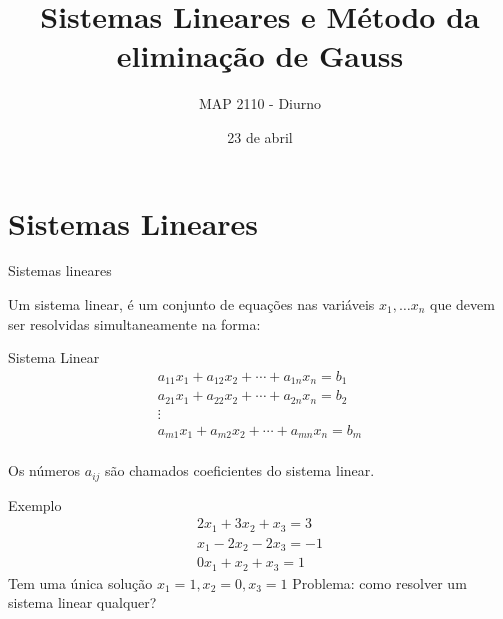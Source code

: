 \documentclass{beamer}
\title[Sistemas Lineares]{Sistemas Lineares e Método da eliminação de Gauss}
\author{MAP 2110 - Diurno}
\institute{IME USP}
\date{23 de abril}
\begin{document}
\begin{frame}
  \titlepage
\end{frame}



\section{Sistemas Lineares}

\begin{frame}{Sistemas lineares}

  Um sistema linear, é um conjunto de equações nas variáveis $x_1,\dots x_n$ que devem ser resolvidas
   simultaneamente na forma:
   \begin{block}{Sistema Linear}
     \begin{gather*}
      a_{11}x_1 + a_{12}x_2 + \cdots + a_{1n}x_n = b_1 \\
      a_{21}x_1 + a_{22}x_2 + \cdots + a_{2n}x_n = b_2 \\
      \vdots \\
      a_{m1}x_1 + a_{m2}x_2 + \cdots + a_{mn}x_n = b_m \\
    \end{gather*}
  \end{block}

   Os números $a_{ij}$ são chamados coeficientes do sistema linear.
\end{frame}

\begin{frame}{Exemplo}
  \begin{gather*}
    2x_1 + 3x_2 + x_3 = 3 \\
    x_1 -2x_2 -2x_3 = -1 \\
    0x_1 + x_2 + x_3 = 1
  \end{gather*}
  Tem uma única solução
  $x_1=1, x_2=0, x_3=1$ 
Problema: como resolver um sistema linear qualquer?
\end{frame}
\end{document}
